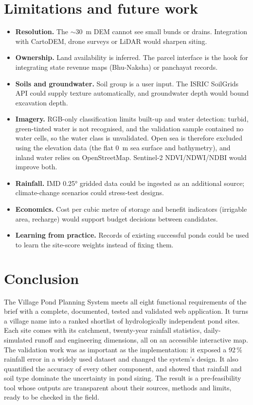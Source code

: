 \documentclass[11pt,a4paper]{article}
\begin{document}
\section{Limitations and future work}
\begin{itemize}
  \item \textbf{Resolution.} The $\sim$\SI{30}{m} DEM cannot see small bunds or drains.
        Integration with CartoDEM, drone surveys or LiDAR would sharpen siting.
  \item \textbf{Ownership.} Land availability is inferred. The parcel interface is the hook for
        integrating state revenue maps (Bhu-Naksha) or panchayat records.
  \item \textbf{Soils and groundwater.} Soil group is a user input. The ISRIC SoilGrids API
        could supply texture automatically, and groundwater depth would bound excavation depth.
  \item \textbf{Imagery.} RGB-only classification limits built-up and water detection: turbid,
        green-tinted water is not recognised, and the validation sample contained no water
        cells, so the water class is unvalidated. Open sea is therefore excluded using the
        elevation data (the flat \SI{0}{m} sea surface and bathymetry), and inland water relies
        on OpenStreetMap. Sentinel-2 NDVI/NDWI/NDBI would improve both.
  \item \textbf{Rainfall.} IMD \ang{0.25} gridded data could be ingested as an additional
        source; climate-change scenarios could stress-test designs.
  \item \textbf{Economics.} Cost per cubic metre of storage and benefit indicators (irrigable
        area, recharge) would support budget decisions between candidates.
  \item \textbf{Learning from practice.} Records of existing successful ponds could be used to
        learn the site-score weights instead of fixing them.
\end{itemize}

\section{Conclusion}
The Village Pond Planning System meets all eight functional requirements of the brief with a
complete, documented, tested and validated web application. It turns a village name into a
ranked shortlist of hydrologically independent pond sites. Each site comes with its catchment,
twenty-year rainfall statistics, daily-simulated runoff and engineering dimensions, all on an
accessible interactive map. The validation work was as important as the implementation: it
exposed a 92\,\% rainfall error in a widely used dataset and changed the system's design. It
also quantified the accuracy of every other component, and showed that rainfall and soil type
dominate the uncertainty in pond sizing. The result is a pre-feasibility tool whose outputs are
transparent about their sources, methods and limits, ready to be checked in the field.
\end{document}
